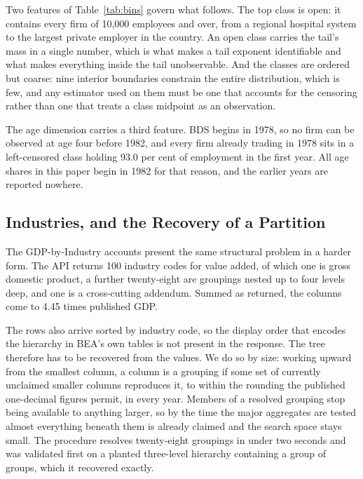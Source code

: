 \documentclass[jrfm,article,submit,pdftex,moreauthors]{Definitions/mdpi}
\begin{document}


Two features of Table~\ref{tab:bins} govern what follows. The top class is open: it contains
every firm of 10{,}000 employees and over, from a regional hospital system to the largest
private employer in the country. An open class carries the tail's mass in a single number, which is what makes a tail
exponent identifiable and what makes everything inside the tail unobservable. And the classes are ordered but coarse: nine
interior boundaries constrain the entire distribution, which is few, and any estimator used
on them must be one that accounts for the censoring rather than one that treats a class
midpoint as an observation.

The age dimension carries a third feature. BDS begins in 1978, so no firm can be observed at
age four before 1982, and every firm already trading in 1978 sits in a left-censored class
holding 93.0 per cent of employment in the first year. All age shares in this paper begin in
1982 for that reason, and the earlier years are reported nowhere.

\subsection{Industries, and the Recovery of a Partition}
\label{subsec:industries}

The GDP-by-Industry accounts present the same structural problem in a harder form. The API
returns 100 industry codes for value added, of which one is gross domestic product, a
further twenty-eight are groupings nested up to four levels deep, and one is a cross-cutting
addendum. Summed as returned, the columns come to 4.45 times published GDP.

The rows also arrive sorted by industry code, so the display order that encodes the
hierarchy in BEA's own tables is not present in the response. The tree therefore has to be
recovered from the values. We do so by size: working upward from the smallest column, a
column is a grouping if some set of currently unclaimed smaller columns reproduces it, to
within the rounding the published one-decimal figures permit, in every year. Members of a
resolved grouping stop being available to anything larger, so by the time the major
aggregates are tested almost everything beneath them is already claimed and the search space
stays small. The procedure resolves twenty-eight groupings in under two seconds and was
validated first on a planted three-level hierarchy containing a group of groups, which it
recovered exactly.
\end{document}
